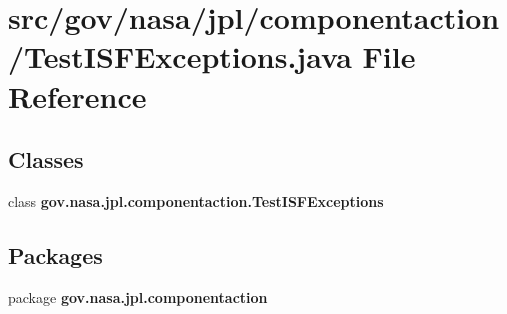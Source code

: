 \section{src/gov/nasa/jpl/componentaction/\+Test\+I\+S\+F\+Exceptions.java File Reference}
\label{_test_i_s_f_exceptions_8java}
\subsection*{Classes}
\begin{DoxyCompactItemize}
\item 
class {\bf gov.\+nasa.\+jpl.\+componentaction.\+Test\+I\+S\+F\+Exceptions}
\end{DoxyCompactItemize}
\subsection*{Packages}
\begin{DoxyCompactItemize}
\item 
package {\bf gov.\+nasa.\+jpl.\+componentaction}
\end{DoxyCompactItemize}
